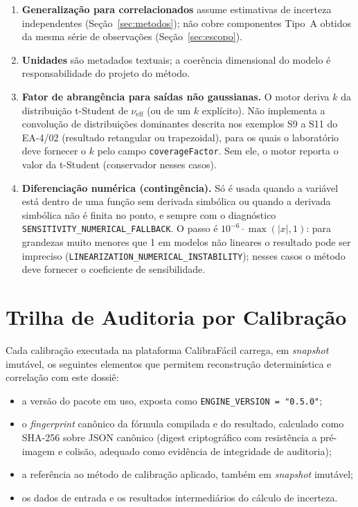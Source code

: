 \documentclass[11pt,a4paper]{article}
\newcommand{\docVersion}{0.5.0}
\begin{document}
\begin{enumerate}
  \item \textbf{Generalização para correlacionados} assume estimativas de incerteza independentes (Seção~\ref{sec:metodos}); não cobre componentes Tipo~A obtidos da mesma série de observações (Seção~\ref{sec:escopo}).
  \item \textbf{Unidades} são metadados textuais; a coerência dimensional do modelo é responsabilidade do projeto do método.
  \item \textbf{Fator de abrangência para saídas não gaussianas.} O motor deriva \(k\) da distribuição t-Student de \(\nu_{\text{eff}}\) (ou de um \(k\) explícito). Não implementa a convolução de distribuições dominantes descrita nos exemplos S9 a S11 do EA-4/02 (resultado retangular ou trapezoidal), para os quais o laboratório deve fornecer o \(k\) pelo campo \texttt{coverageFactor}. Sem ele, o motor reporta o valor da t-Student (conservador nesses casos).
  \item \textbf{Diferenciação numérica (contingência).} Só é usada quando a variável está dentro de uma função sem derivada simbólica ou quando a derivada simbólica não é finita no ponto, e sempre com o diagnóstico \texttt{SENSITIVITY\_NUMERICAL\_FALLBACK}. O passo é \(10^{-6} \cdot \max(|x|, 1)\): para grandezas muito menores que 1 em modelos não lineares o resultado pode ser impreciso (\texttt{LINEARIZATION\_NUMERICAL\_INSTABILITY}); nesses casos o método deve fornecer o coeficiente de sensibilidade.
\end{enumerate}

\section{Trilha de Auditoria por Calibração}

Cada calibração executada na plataforma CalibraFácil carrega, em \emph{snapshot} imutável, os seguintes elementos que permitem reconstrução determinística e correlação com este dossiê:

\begin{itemize}
  \item a versão do pacote em uso, exposta como \texttt{ENGINE\_VERSION = "\docVersion"};
  \item o \emph{fingerprint} canônico da fórmula compilada e do resultado, calculado como SHA-256 sobre JSON canônico (digest criptográfico com resistência a pré-imagem e colisão, adequado como evidência de integridade de auditoria);
  \item a referência ao método de calibração aplicado, também em \emph{snapshot} imutável;
  \item os dados de entrada e os resultados intermediários do cálculo de incerteza.
\end{itemize}
\end{document}
